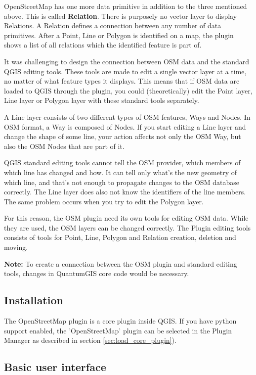 OpenStreetMap has one more data primitive in addition to the three mentioned
above. This is called \textbf{Relation}. There is purposely no vector layer 
to display Relations. A Relation defines a connection between any number of
data primitives. After a Point, Line or Polygon is identified on a map,
the plugin shows a list of all relations which the identified feature is part of.

It was challenging to design the connection between OSM data and the
standard QGIS editing tools. These tools are made to edit a single vector
layer at a time, no matter of what feature types it displays. This means
that if OSM data are loaded to QGIS through the plugin, you could
(theoretically) edit the Point layer, Line layer or Polygon layer with these
standard tools separately.

A Line layer consists of two different types of OSM features, Ways and Nodes. In OSM format, a Way is composed of Nodes. If you start editing a Line layer and change the shape of some line, your action affects not only the OSM Way, but also the OSM Nodes that are part of it.

QGIS standard editing tools cannot tell the OSM provider, which members
of which line has changed and how. It can tell only what's the new geometry
of which line, and that's not enough to propagate changes to the OSM database
correctly. The Line layer does also not know the identifiers of the line
members. The same problem occurs when you try to edit the Polygon layer.

For this reason, the OSM plugin need its own tools for editing OSM data.
While they are used, the OSM layers can be changed correctly. The Plugin
editing tools consists of tools for Point, Line, Polygon and
Relation creation, deletion and moving.

\textbf{Note:} To create a connection between the OSM plugin and standard
editing tools, changes in QuantumGIS core code would be necessary.

\subsection{Installation}

The OpenStreetMap plugin is a core plugin inside QGIS. If you have python
support enabled, the 'OpenStreetMap' plugin can be selected in the Plugin
Manager as described in section \ref{sec:load_core_plugin}).

\subsection{Basic user interface}


